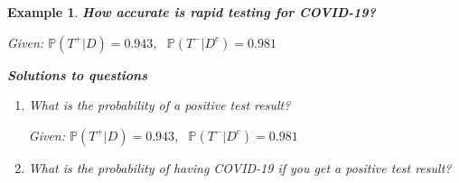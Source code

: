 \documentclass[12pt]{amsart}
\newtheorem{example}[theorem]{Example}
\begin{document}
\begin{example}  {\large \textbf{How accurate is rapid testing for COVID-19?} }
{\begin{itemize}


\end{itemize}

\newpage
Given: $\mathbb{P}(T^+|D) = 0.943$, $\ \ \mathbb{P}(T^-|D^c) = 0.981$ %

\vspace{0.5cm}
\textbf{Solutions to questions} %
\begin{enumerate}
\item What is the probability of a positive test result?

\vspace{2cm}

\newpage
Given: $\mathbb{P}(T^+|D) = 0.943$, $\ \ \mathbb{P}(T^-|D^c) = 0.981$ %

\vspace{0.5cm}
\item What is the probability of having COVID-19 if you get a positive test result?




\end{enumerate}}
\end{example}
\end{document}
